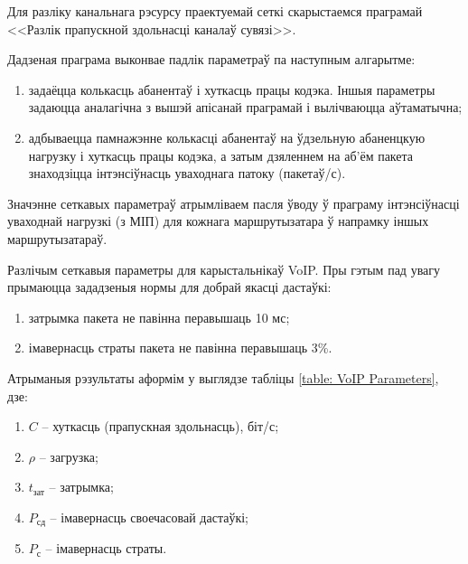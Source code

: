 Для разліку канальнага рэсурсу праектуемай сеткі скарыстаемся
праграмай <<Разлік прапускной здольнасці каналаў сувязі>>.

Дадзеная праграма выконвае падлік параметраў па наступным
алгарытме:
\begin{enumerate}
    \item задаёцца колькасць абанентаў і хуткасць працы кодэка.
          Іншыя параметры задаюцца аналагічна з вышэй апісанай
          праграмай і вылічваюцца аўтаматычна;
    \item адбываецца памнажэнне колькасці абанентаў на ўдзельную
          абаненцкую нагрузку і хут\-касць працы кодэка, а затым
          дзяленнем на аб'ём пакета знаходзіцца інтэнсіўнасць
          уваходнага патоку (пакетаў/с).
\end{enumerate}

Значэнне сеткавых параметраў атрымліваем пасля ўводу ў праграму
інтэнсіўнасці уваходнай нагрузкі (з МІП) для кожнага маршрутызатара
ў напрамку іншых маршрутызатараў.

Разлічым сеткавыя параметры для карыстальнікаў VoIP. Пры гэтым пад
увагу прымаюцца зададзеныя нормы для добрай якасці дастаўкі:
\begin{enumerate}
    \item затрымка пакета не павінна перавышаць 10 мс;
    \item імавернасць страты пакета не павінна перавышаць 3\%.
\end{enumerate}

Атрыманыя рэзультаты аформім у выглядзе табліцы
\ref{table: VoIP Parameters}, дзе:
\begin{enumerate}
    \item $C$ -- хуткасць (прапускная здольнасць), біт/с;
    \item $\rho$ -- загрузка;
    \item $t_{\text{зат}}$ -- затрымка;
    \item $P_{\text{сд}}$ -- імавернасць своечасовай дастаўкі;
    \item $P_{\text{с}}$ -- імавернасць страты.
\end{enumerate}

